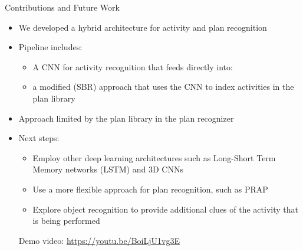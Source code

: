 \documentclass{beamer}
\begin{document}
\begin{frame}{Contributions and Future Work}
   	\begin{itemize}
   		\item We developed a hybrid architecture for activity and plan recognition
        \item Pipeline includes:
        \begin{itemize}
            \item A CNN for activity recognition that feeds directly into:
            \item a modified (SBR) approach that uses the CNN to index activities in the plan library
        \end{itemize}
        
        \item Approach limited by the plan library in the plan recognizer
        \item Next steps:
		\begin{itemize}
			\item Employ other deep learning architectures such as Long-Short Term Memory networks (LSTM) and 3D CNNs
	        \item Use a more flexible approach for plan recognition, such as PRAP
	        \item Explore object recognition to provide additional clues of the activity that is being performed 
		\end{itemize}
		\begin{center}
			Demo video: \url{https://youtu.be/BoiLjU1vg3E}
		\end{center}
    \end{itemize}
\end{frame}


\end{document}
